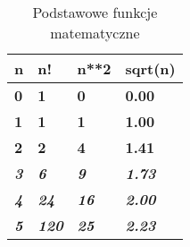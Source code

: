 \begin{table}[h]
\centering
\begin{tabular}{|l|l|l|l|}
\hline
\textbf{n}          & \textbf{n!}           & \textbf{n**2}        & \textbf{sqrt(n)}       \\ \hline
\textbf{0}          & \textbf{1}            & \textbf{0}           & \textbf{0.00}             \\ \hline
\textbf{1}          & \textbf{1}            & \textbf{1}           & \textbf{1.00}             \\ \hline
\textbf{2}          & \textbf{2}            & \textbf{4}           & \textbf{1.41}          \\ \hline
\textit{\textbf{3}} & \textit{\textbf{6}}   & \textit{\textbf{9}}  & \textit{\textbf{1.73}} \\ \hline
\textit{\textbf{4}} & \textit{\textbf{24}}  & \textit{\textbf{16}} & \textit{\textbf{2.00}} \\ \hline
\textit{\textbf{5}} & \textit{\textbf{120}} & \textit{\textbf{25}} & \textit{\textbf{2.23}} \\ \hline
\end{tabular}
\label{tab: functions}
\caption{Podstawowe funkcje matematyczne}
\end{table}
